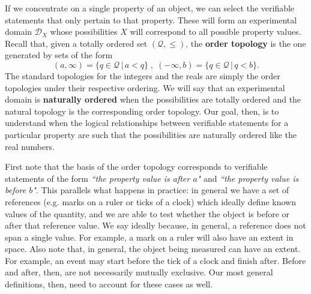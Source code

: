 \documentclass[submission,copyright,creativecommons]{eptcs}
\newcommand{\edomain}[1][D] {\mathcal{#1}} %
\newcommand{\statement}[1] {\emph{``#1"}}
\begin{document}
If we concentrate on a single property of an object, we can select the verifiable statements that only pertain to that property. These will form an experimental domain $\edomain_X$ whose possibilities $X$ will correspond to all possible property values. Recall that, given a totally ordered set $(\mathcal{Q}, \leq)$, the \textbf{order topology} is the one generated by sets of the form $$(a, \infty) = \{q \in \mathcal{Q} \, | \, a < q\} \;,\; (-\infty, b) = \{q \in \mathcal{Q} \, | \, q < b\}.$$
The standard topologies for the integers and the reals are simply the order topologies under their respective ordering. We will say that an experimental domain is \textbf{naturally ordered} when the possibilities are totally ordered and the natural topology is the corresponding order topology. Our goal, then, is to understand when the logical relationships between verifiable statements for a particular property are such that the possibilities are naturally ordered like the real numbers.

First note that the basis of the order topology corresponds to verifiable statements of the form \statement{the property value is after $a$} and \statement{the property value is before $b$}. This parallels what happens in practice: in general we have a set of references (e.g. marks on a ruler or ticks of a clock) which ideally define known values of the quantity, and we are able to test whether the object is before or after that reference value. We say ideally because, in general, a reference does not span a single value. For example, a mark on a ruler will also have an extent in space. Also note that, in general, the object being measured can have an extent. For example, an event may start before the tick of a clock and finish after. Before and after, then, are not necessarily mutually exclusive. Our most general definitions, then, need to account for these cases as well.
\end{document}
